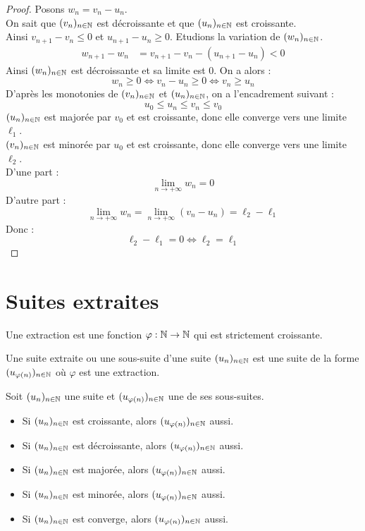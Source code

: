 \begin{proof}
    Posons $w_n = v_n - u_n$.
    \\ 
    On sait que $(v_n)_{n \in \mathbb{N}}$ est décroissante et que $(u_n)_{n \in \mathbb{N}}$ est croissante. 
    \\ 
    Ainsi $v_{n+1} - v_n \leq 0$ et $u_{n+1} - u_n \geq 0$.
    Etudions la variation de $(w_n)_{n \in \mathbb{N}}$.
    \begin{align*}
        w_{n+1} - w_n &= v_{n+1} - v_n - (u_{n+1} - u_n) < 0
    \end{align*}
    Ainsi $(w_n)_{n \in \mathbb{N}}$ est décroissante et sa limite est $0$.
    On a alors  :
    \[ w_n \geq 0 \iff  v_n - u_n \geq 0 \iff v_n \geq u_n \]
    D'après les monotonies de $(v_n)_{n \in \mathbb{N}}$ et $(u_n)_{n \in \mathbb{N}}$, on a l'encadrement suivant : 
    \[ u_0 \leq u_n \leq v_n \leq v_0 \]
    $(u_n)_{n \in \mathbb{N}}$ est majorée par $v_0$ et est croissante, donc elle converge vers une limite $\ell_1$.
    \\ 
    $(v_n)_{n \in \mathbb{N}}$ est minorée par $u_0$ et est croissante, donc elle converge vers une limite $\ell_2$.
    \\
    D'une part :
    \[ \lim_{n \to +\infty} w_n = 0 \]
    D'autre part :
    \[ \lim_{n \to +\infty} w_n = \lim_{n \to +\infty} (v_n - u_n) = \ell_2 - \ell_1 \]
    Donc :
    \[ \ell_2 - \ell_1 = 0 \iff \ell_2 = \ell_1 \]
\end{proof}

\section{Suites extraites}
\begin{definition}[Extraction]
    Une extraction est une fonction $\varphi : \mathbb{N} \to \mathbb{N}$ qui est strictement croissante.
\end{definition}

\begin{definition}
    Une suite extraite ou une sous-suite d'une suite $(u_n)_{n \in \mathbb{N}}$ est une suite de la forme $(u_{\varphi(n)})_{n \in \mathbb{N}}$ où $\varphi$ est une extraction.
\end{definition}

\begin{proposition}
    Soit $(u_n)_{n \in \mathbb{N}}$ une suite et $(u_{\varphi(n)})_{n \in \mathbb{N}}$ une de ses sous-suites.
    \begin{itemize}
        \item Si $(u_n)_{n \in \mathbb{N}}$ est croissante, alors $(u_{\varphi(n)})_{n \in \mathbb{N}}$ aussi.
        \item Si $(u_n)_{n \in \mathbb{N}}$ est décroissante, alors $(u_{\varphi(n)})_{n \in \mathbb{N}}$ aussi.
        \item Si $(u_n)_{n \in \mathbb{N}}$ est majorée, alors $(u_{\varphi(n)})_{n \in \mathbb{N}}$ aussi.
        \item Si $(u_n)_{n \in \mathbb{N}}$ est minorée, alors $(u_{\varphi(n)})_{n \in \mathbb{N}}$ aussi.
        \item Si $(u_n)_{n \in \mathbb{N}}$ est converge, alors $(u_{\varphi(n)})_{n \in \mathbb{N}}$ aussi.
    \end{itemize}
\end{proposition}

